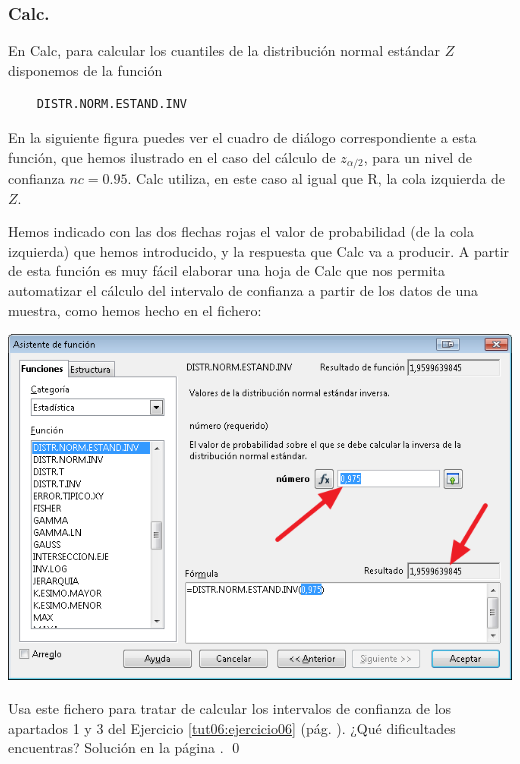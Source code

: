 \documentclass[10pt,a4paper]{article}\usepackage[]{graphicx}\usepackage[]{color}
\begin{document}
\subsubsection*{Calc.}
\label{tut06:subsubsec:IntConfMediaZCalc}

En Calc, para calcular los cuantiles de la distribución normal estándar $Z$ disponemos de la función
\begin{verbatim}
    DISTR.NORM.ESTAND.INV
\end{verbatim}
En la siguiente figura puedes ver el cuadro de diálogo correspondiente a esta función, que hemos ilustrado en el caso del cálculo de $z_{\alpha/2}$, para un nivel de confianza $nc=0.95$. Calc utiliza, en este caso al igual que R, la cola izquierda de $Z$.

Hemos indicado con las dos flechas rojas el valor de probabilidad (de la cola izquierda) que hemos introducido, y la respuesta que Calc va a producir. A partir de esta función es muy fácil elaborar una hoja de Calc que nos permita automatizar el cálculo del intervalo de confianza a partir de los datos de una muestra, como hemos hecho en el fichero:
\begin{center}
\end{center}

\begin{center}
\includegraphics[width=14cm]{../fig/Tut06-09.png}
\end{center}
\vspace{3mm}

\begin{ejercicio}
\label{tut06:ejercicio08}
Usa este fichero para tratar de calcular los intervalos de confianza de los apartados 1 y 3 del Ejercicio \ref{tut06:ejercicio06} (pág. \pageref{tut06:ejercicio06}). ¿Qué dificultades encuentras? Solución en la página \pageref{tut06:ejercicio08:sol}.
\qed
\end{ejercicio}
\end{document}
